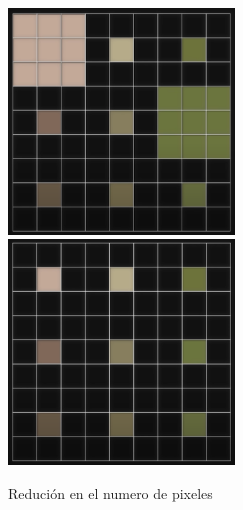 \documentclass{article}
\begin{document}
\begin{figure}[h]
\includegraphics[width=6cm]{MatrizCompleta.png}
\includegraphics[width=6cm]{MatrizReducida.png}
\centering
\caption{Redución en el numero de pixeles}
\label{fig:matriz de leds}
\end{figure}
\end{document}
